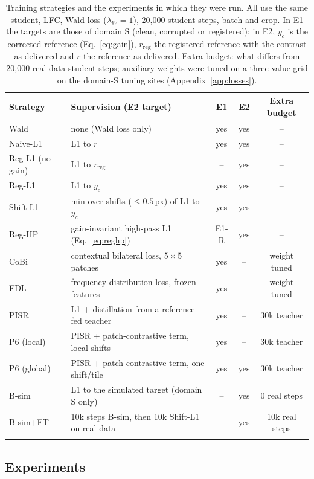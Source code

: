 \documentclass[pdflatex,sn-basic,referee,lineno]{sn-jnl}
\newcommand{\rreg}{r_{\mathrm{reg}}}
\begin{document}
\begin{table}[t]
\caption{Training strategies and the experiments in which they were run. All use the same student, LFC, Wald loss
($\lambda_W=1$), 20,000 student steps, batch and crop. In E1 the targets are those of domain S (clean, corrupted or
registered); in E2, $y_c$ is the corrected reference (Eq.~\ref{eq:gain}), $\rreg$ the registered reference with the
contrast as delivered and $r$ the reference as delivered. Extra budget: what differs from 20,000 real-data student
steps; auxiliary weights were tuned on a three-value grid on the domain-S tuning sites (Appendix~\ref{app:losses}).}\label{tab:methods}
\footnotesize
\begin{tabular*}{\textwidth}{@{\extracolsep\fill}llccc}
\toprule
Strategy & Supervision (E2 target) & E1 & E2 & Extra budget \\
\midrule
Wald & none (Wald loss only) & yes & yes & -- \\
Naive-L1 & L1 to $r$ & yes & yes & -- \\
Reg-L1 (no gain) & L1 to $\rreg$ & -- & yes & -- \\
Reg-L1 & L1 to $y_c$ & yes & yes & -- \\
Shift-L1 & min over shifts ($\le0.5$\,px) of L1 to $y_c$ & yes & yes & -- \\
Reg-HP & gain-invariant high-pass L1 (Eq.~\ref{eq:reghp}) & E1-R & yes & -- \\
CoBi & contextual bilateral loss, $5\times5$ patches & yes & -- & weight tuned \\
FDL & frequency distribution loss, frozen features & yes & -- & weight tuned \\
PISR & L1 + distillation from a reference-fed teacher & yes & -- & 30k teacher \\
P6 (local) & PISR + patch-contrastive term, local shifts & yes & -- & 30k teacher \\
P6 (global) & PISR + patch-contrastive term, one shift/tile & yes & yes & 30k teacher \\
B-sim & L1 to the simulated target (domain S only) & -- & yes & 0 real steps \\
B-sim+FT & 10k steps B-sim, then 10k Shift-L1 on real data & -- & yes & 10k real steps \\
\botrule
\end{tabular*}
\end{table}

\subsection{Experiments}
\end{document}
